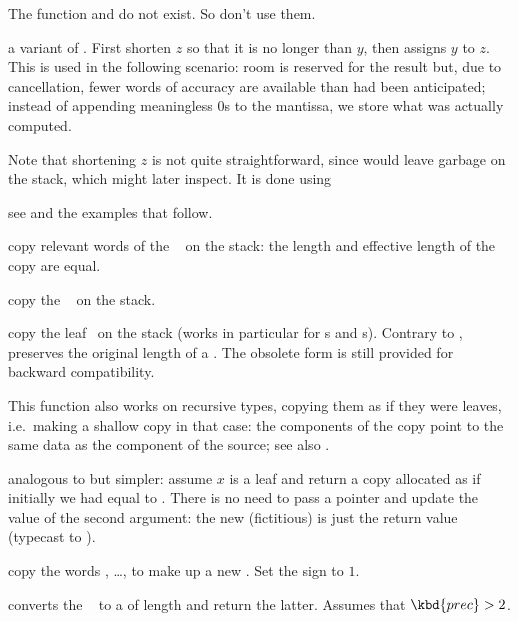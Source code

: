 \noindent The function  and  do not exist. So don't use
them.

 a variant of . First shorten
$z$ so that it is no longer than $y$, then assigns $y$ to $z$. This is used
in the following scenario: room is reserved for the result but, due to
cancellation, fewer words of accuracy are available than had been
anticipated; instead of appending meaningless $0$s to the mantissa, we store
what was actually computed.

Note that shortening $z$ is not quite straightforward, since 
would leave garbage on the stack, which  might later inspect.
It is done using

 see  and the examples that
follow.


 copy relevant words of the ~ on the
stack: the length and effective length of the copy are equal.

 copy the ~ on the stack.

 copy the leaf~ on the
stack (works in particular for s and s).
Contrary to ,  preserves the original
length of a . The obsolete form 
is still provided for backward compatibility.

This function also works on recursive types, copying them as if they were
leaves, i.e.~making a shallow copy in that case: the components of the copy
point to the same data as the component of the source; see also
.

 analogous to 
but simpler: assume $x$ is a leaf and return a copy allocated as if
initially we had  equal to . There is no need to pass a
pointer and update the value of the second argument: the new (fictitious)
 is just the return value (typecast to ).

 copy the  words
, \dots,  to make up a new . Set the sign
to $1$.


 converts the ~ to a
 of length  and return the latter.
Assumes that $\kbd{prec} > 2$.

